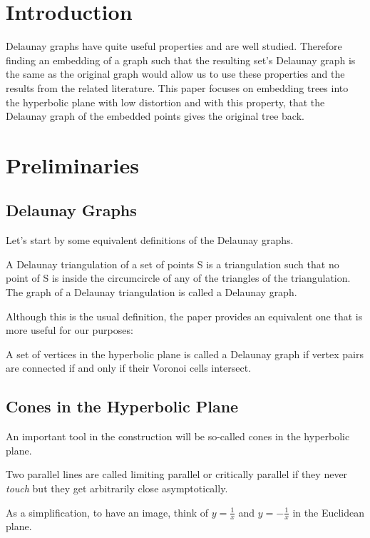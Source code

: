 \section{Introduction}
Delaunay graphs have quite useful properties and are well studied. Therefore finding an embedding of a graph such that the resulting set's Delaunay graph is the same as the original graph would allow us to use these properties and the results from the related literature. This paper focuses on embedding trees into the hyperbolic plane with low distortion and with this property, that the Delaunay graph of the embedded points gives the original tree back.
\section{Preliminaries}
\subsection{Delaunay Graphs}
Let's start by some equivalent definitions of the Delaunay graphs.
\begin{definition}
A Delaunay triangulation of a set of points S is a triangulation such that no point of S is inside the circumcircle of any of the triangles of the triangulation. The graph of a Delaunay triangulation is called a Delaunay graph.
\end{definition}

Although this is the usual definition, the paper provides an equivalent one that is more useful for our purposes:

\begin{definition}
A set of vertices in the hyperbolic plane is called a Delaunay graph if vertex pairs are connected if and only if their Voronoi cells intersect.
\end{definition}

\subsection{Cones in the Hyperbolic Plane}
An important tool in the construction will be so-called cones in the hyperbolic plane.

\begin{definition}
Two parallel lines are called limiting parallel or critically parallel if they never \textit{touch} but they get arbitrarily close asymptotically.
\end{definition}

As a simplification, to have an image, think of $y = \frac{1}{x}$ and $y = -\frac{1}{x}$ in the Euclidean plane.

